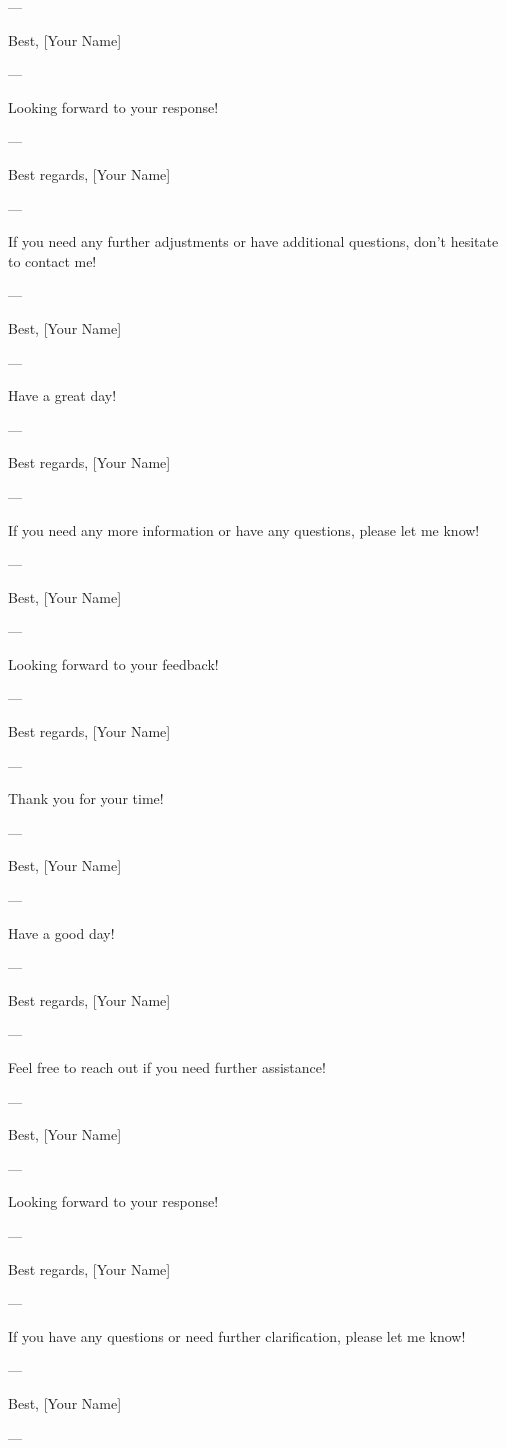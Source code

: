 --- 

Best,  
[Your Name]  

--- 

Looking forward to your response! 

--- 

Best regards,  
[Your Name]  

--- 

If you need any further adjustments or have additional questions, don't hesitate to contact me! 

--- 

Best,  
[Your Name]  

--- 

Have a great day! 

--- 

Best regards,  
[Your Name]  

--- 

If you need any more information or have any questions, please let me know! 

--- 

Best,  
[Your Name]  

--- 

Looking forward to your feedback! 

--- 

Best regards,  
[Your Name]  

--- 

Thank you for your time! 

--- 

Best,  
[Your Name]  

--- 

Have a good day! 

--- 

Best regards,  
[Your Name]  

--- 

Feel free to reach out if you need further assistance! 

--- 

Best,  
[Your Name]  

--- 

Looking forward to your response! 

--- 

Best regards,  
[Your Name]  

--- 

If you have any questions or need further clarification, please let me know! 

--- 

Best,  
[Your Name]  

--- 

